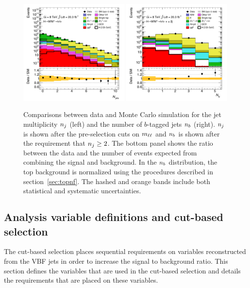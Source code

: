 \begin{figure}[h!]
  \centering
  \captionsetup{justification=centering}
  \includegraphics[width=0.49\textwidth]{figures/VBF_cb_njets}
  \includegraphics[width=0.49\textwidth]{figures/VBF_cb_nb}

  \caption{Comparisons between data and Monte Carlo simulation for the jet multiplicity $n_j$ (left) and the number of $b$-tagged jets $n_b$ (right). $n_j$ is shown after the pre-selection cuts on $m_{\ell\ell}$ and $n_b$ is shown after the requirement that $n_j \geq 2$. The bottom panel shows the ratio between the data and the number of events expected from combining the signal and background. In the $n_b$ distribution, the top background is normalized using the procedures described in section~\ref{sec:topnf}. The hashed and orange bands include both statistical and systematic uncertainties.}
  \label{fig:njets}
\end{figure}

\subsection{Analysis variable definitions and cut-based selection}
\label{sec:vbf_cb_def}
The cut-based selection places sequential requirements on variables reconstructed from the VBF jets in order to increase the signal to background ratio. This section defines the variables that are used in the cut-based selection and details the requirements that are placed on these variables. 

